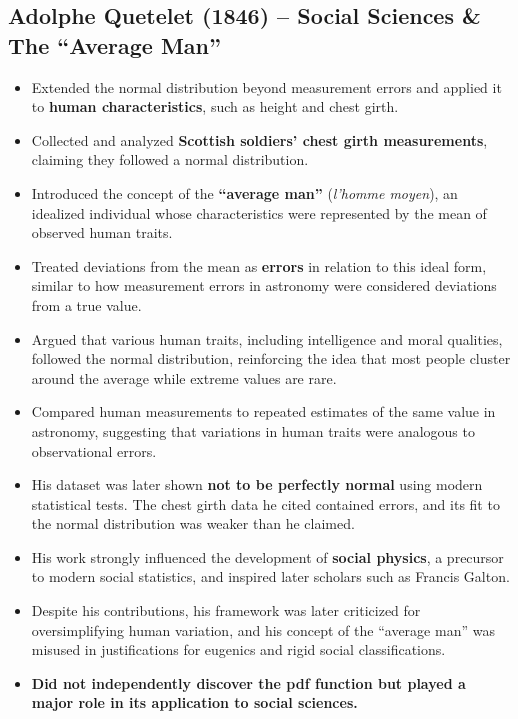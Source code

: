 \documentclass{article}
\begin{document}
\subsection{Adolphe Quetelet (1846) – Social Sciences \& The “Average Man”}
\begin{itemize}
    \item Extended the normal distribution beyond measurement errors and applied it to \textbf{human characteristics}, such as height and chest girth.
    \item Collected and analyzed \textbf{Scottish soldiers' chest girth measurements}, claiming they followed a normal distribution.
    \item Introduced the concept of the \textbf{“average man”} (\textit{l’homme moyen}), an idealized individual whose characteristics were represented by the mean of observed human traits.
    \item Treated deviations from the mean as \textbf{errors} in relation to this ideal form, similar to how measurement errors in astronomy were considered deviations from a true value.
    \item Argued that various human traits, including intelligence and moral qualities, followed the normal distribution, reinforcing the idea that most people cluster around the average while extreme values are rare.
    \item Compared human measurements to repeated estimates of the same value in astronomy, suggesting that variations in human traits were analogous to observational errors.
    \item His dataset was later shown \textbf{not to be perfectly normal} using modern statistical tests. The chest girth data he cited contained errors, and its fit to the normal distribution was weaker than he claimed.
    \item His work strongly influenced the development of \textbf{social physics}, a precursor to modern social statistics, and inspired later scholars such as Francis Galton.
    \item Despite his contributions, his framework was later criticized for oversimplifying human variation, and his concept of the “average man” was misused in justifications for eugenics and rigid social classifications.
    \item \textbf{Did not independently discover the pdf function but played a major role in its application to social sciences.}
\end{itemize}
\end{document}

